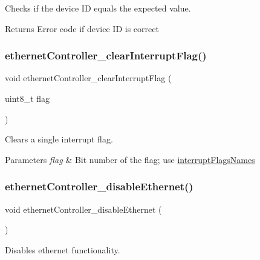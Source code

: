 Checks if the device ID equals the expected value. 

\begin{DoxyReturn}{Returns}
Error code if device ID is correct 
\end{DoxyReturn}
\mbox{\label{group__init_ga472d2ba5053ebbb349e514699adfcde3}} 
\subsubsection{\texorpdfstring{ethernetController\_clearInterruptFlag()}{ethernetController\_clearInterruptFlag()}}
{\footnotesize\ttfamily void ethernet\+Controller\+\_\+clear\+Interrupt\+Flag (\begin{DoxyParamCaption}\item[{uint8\+\_\+t}]{flag }\end{DoxyParamCaption})}



Clears a single interrupt flag. 


\begin{DoxyParams}{Parameters}
{\em flag} & Bit number of the flag; use \mbox{\hyperlink{group__interrupts_gaf692e993b72f242633eee1b443276547}{interrupt\+Flags\+Names}} \\
\hline
\end{DoxyParams}
\mbox{\label{group__init_gaadd13e81fe0097411b3aae2f6810bbe1}} 
\subsubsection{\texorpdfstring{ethernetController\_disableEthernet()}{ethernetController\_disableEthernet()}}
{\footnotesize\ttfamily void ethernet\+Controller\+\_\+disable\+Ethernet (\begin{DoxyParamCaption}{ }\end{DoxyParamCaption})}



Disables ethernet functionality. 

